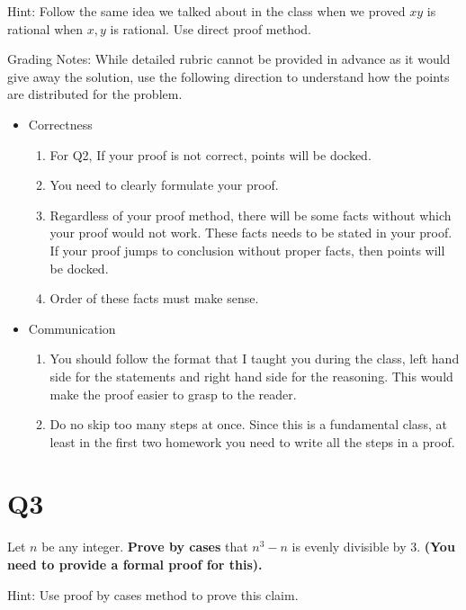 \documentclass[12pt]{exam}
\begin{document}
Hint: Follow the same idea we talked about in the class when we proved $xy$ is rational when $x,y$ is rational. Use direct proof method.

Grading Notes:
While detailed rubric cannot be provided in advance as it would give away the solution, use the following direction to understand how the points are distributed for the problem.
\begin{itemize}
    \item Correctness
    \begin{enumerate}
        \item For Q2, If your proof is not correct, points will be docked. 
        \item You need to clearly formulate your proof.
        \item Regardless of your proof method, there will be some facts without which your proof would not work. These facts needs to be stated in your proof. If your proof jumps to conclusion without proper facts, then points will be docked.
        \item Order of these facts must make sense. 
    \end{enumerate}
        
    \item Communication 
    \begin{enumerate}
        \item You should follow the format that I taught you during the class, left hand side for the statements and right hand side for the reasoning. This would make the proof easier to grasp to the reader.
        \item Do no skip too many steps at once. Since this is a fundamental class, at least in the first two homework you need to write all the steps in a proof. 
    \end{enumerate}
        
\end{itemize}



\section{Q3}
Let $n$ be any integer. \textbf{Prove by cases} that $n^3-n$ is evenly divisible by $3$. \textbf{(You need to provide a formal proof for this).}


Hint: Use proof by cases method to prove this claim.
\end{document}
